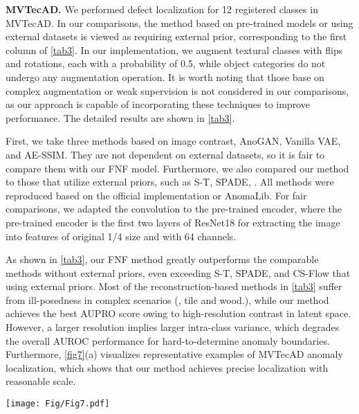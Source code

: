 \noindent\textbf{MVTecAD.}
We performed defect localization for 12 registered classes in MVTecAD.
In our comparisons, the method based on pre-trained models or using external datasets is viewed as requiring external prior, corresponding to the first column of \cref{tab3}.
In our implementation, we augment textural classes with flips and rotations, each with a probability of 0.5, while object categories do not undergo any augmentation operation.
It is worth noting that those base on complex augmentation or weak supervision is not considered in our comparisons, as our approach is capable of incorporating these techniques to improve performance. The detailed results are shown in \cref{tab3}.

First, we take three methods based on image contrast, AnoGAN\cite{AnoGAN}, Vanilla VAE\cite{VanillaVAE}, and AE-SSIM\cite{AE-SSIM}. They are not dependent on external datasets, so it is fair to compare them with our FNF model.
Furthermore, we also compared our method to those that utilize external priors, such as S-T, SPADE, \etc. All methods were reproduced based on the official implementation or AnomaLib\cite{Anomalib}.
For fair comparisons, we adapted the  convolution  to the pre-trained encoder, where the pre-trained encoder is the first two layers of ResNet18 for extracting the image into features of original 1/4 size and with 64 channels.

As shown in \cref{tab3}, our FNF method greatly outperforms the comparable methods without external priors, even exceeding S-T, SPADE, and CS-Flow that using external priors.
Most of the reconstruction-based methods in \cref{tab3} suffer from ill-posedness in complex scenarios (\eg, tile and wood.), while our method achieves the best AUPRO score owing to high-resolution contrast in latent space.
However, a larger resolution implies larger intra-class variance, which degrades the overall AUROC performance for hard-to-determine anomaly boundaries.
Furthermore, \cref{fig7}(a) visualizes representative examples of MVTecAD anomaly localization, which shows that our method achieves precise localization with reasonable scale.


\begin{figure*}
    \centering
    \setlength{\abovecaptionskip}{0.cm} \setlength{\belowcaptionskip}{-0.6cm} 

    \texttt{[image: Fig/Fig7.pdf]}
    \caption{
        Visualization of our results on MVTecAD and BTAD. 
        From top to bottom are original images, estimated image templates, our localization results, and ground truths.
        \textbf{(a)} The six challenging results on MVTecAD. \textbf{(b)} Two representative results on BTAD. \textbf{(c)} Results for the four unregistered categories on MVTecAD.
    }
    \label{fig7}
\end{figure*}


